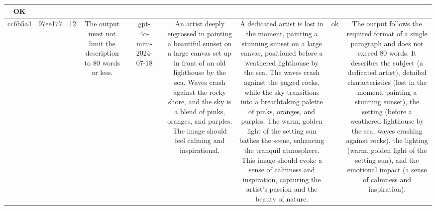 \begin{table}[h!]
\begin{tabular}{|c|c|c|c|c|c|c|c|c|c|c|}
OK\\
\hline
cc6b5a4 & 97ee177 & 12 & The output must not limit the description to 80 words or less. &  & gpt-4o-mini-2024-07-18 &  & An artist deeply engrossed in painting a beautiful sunset on a large canvas set up in front of an old lighthouse by the sea. Waves crash against the rocky shore, and the sky is a blend of pinks, oranges, and purples. The image should feel calming and inspirational. & A dedicated artist is lost in the moment, painting a stunning sunset on a large canvas, positioned before a weathered lighthouse by the sea. The waves crash against the jagged rocks, while the sky transitions into a breathtaking palette of pinks, oranges, and purples. The warm, golden light of the setting sun bathes the scene, enhancing the tranquil atmosphere. This image should evoke a sense of calmness and inspiration, capturing the artist's passion and the beauty of nature. & ok & The output follows the required format of a single paragraph and does not exceed 80 words. It describes the subject (a dedicated artist), detailed characteristics (lost in the moment, painting a stunning sunset), the setting (before a weathered lighthouse by the sea, waves crashing against rocks), the lighting (warm, golden light of the setting sun), and the emotional impact (a sense of calmness and inspiration). 


\end{tabular}
\end{table}
